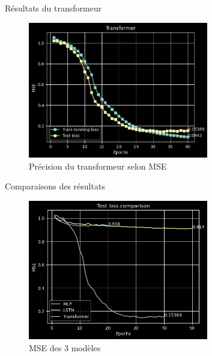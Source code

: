 \documentclass{beamer}
\begin{document}
\begin{frame}{Résultats du transformeur}
\begin{figure} \label{fig:transformer_accuracy}
    \caption{Précision du transformeur selon MSE} \center
    \includegraphics[width=0.7\textwidth]{images/2023-04-02-13-48-49.png}
\end{figure}
\end{frame}
\begin{frame}{Comparaisons des résultats}
\begin{figure}
    \caption{MSE des 3 modèles} \center
    \includegraphics[width=0.7\textwidth]{images/comparaison.png}
\end{figure}
\end{frame}
\end{document}
